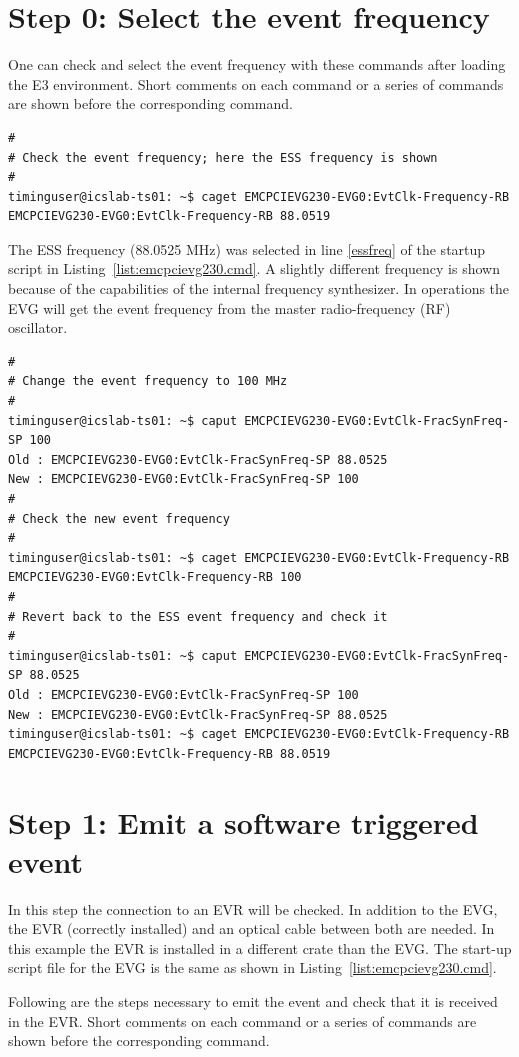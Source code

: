 \documentclass[11pt
  , a4paper
  , article
  , oneside
  , showtrims
]{memoir}
\begin{document}
\section{Step 0: Select the event frequency}
One can check and select the event frequency with these commands after loading the E3 environment. Short comments on each command or a series of commands are shown before the corresponding command.
\begin{lstlisting}[style=termstyle]
#
# Check the event frequency; here the ESS frequency is shown
#
timinguser@icslab-ts01: ~$ caget EMCPCIEVG230-EVG0:EvtClk-Frequency-RB
EMCPCIEVG230-EVG0:EvtClk-Frequency-RB 88.0519
\end{lstlisting}
The ESS frequency (88.0525 MHz) was selected in line \ref{essfreq} of the startup script in Listing~\ref{list:emcpcievg230.cmd}. A slightly different frequency is shown because of the capabilities of the internal frequency synthesizer. In operations the EVG will get the event frequency from the master radio-frequency (RF) oscillator.
\begin{lstlisting}[style=termstyle]
#
# Change the event frequency to 100 MHz
#
timinguser@icslab-ts01: ~$ caput EMCPCIEVG230-EVG0:EvtClk-FracSynFreq-SP 100
Old : EMCPCIEVG230-EVG0:EvtClk-FracSynFreq-SP 88.0525
New : EMCPCIEVG230-EVG0:EvtClk-FracSynFreq-SP 100
#
# Check the new event frequency
#
timinguser@icslab-ts01: ~$ caget EMCPCIEVG230-EVG0:EvtClk-Frequency-RB
EMCPCIEVG230-EVG0:EvtClk-Frequency-RB 100
#
# Revert back to the ESS event frequency and check it
#
timinguser@icslab-ts01: ~$ caput EMCPCIEVG230-EVG0:EvtClk-FracSynFreq-SP 88.0525
Old : EMCPCIEVG230-EVG0:EvtClk-FracSynFreq-SP 100
New : EMCPCIEVG230-EVG0:EvtClk-FracSynFreq-SP 88.0525
timinguser@icslab-ts01: ~$ caget EMCPCIEVG230-EVG0:EvtClk-Frequency-RB
EMCPCIEVG230-EVG0:EvtClk-Frequency-RB 88.0519
\end{lstlisting}

\section{Step 1: Emit a software triggered event}
In this step the connection to an EVR will be checked. In addition to the EVG, the EVR (correctly installed) and an optical cable between both are needed. In this example the EVR is installed in a different crate than the EVG. The start-up script file for the EVG is the same as shown in Listing~\ref{list:emcpcievg230.cmd}.

Following are the steps necessary to emit the event and check that it is received in the EVR. Short comments on each command or a series of commands are shown before the corresponding command.
\end{document}
